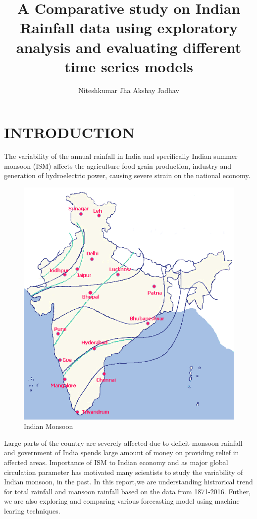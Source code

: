 \documentclass[12pt,openany]{book}
\title{A Comparative study on Indian Rainfall data using exploratory analysis and evaluating different time series models}
\author{Niteshkumar Jha Akshay Jadhav}
\date{}
\begin{document}
\maketitle

{
\setcounter{tocdepth}{1}
\tableofcontents
}
\listoftables
\listoffigures
\hypertarget{intro}{%
\chapter{INTRODUCTION}\label{intro}}

The variability of the annual rainfall in India and specifically Indian summer monsoon (ISM) affects the agriculture food grain production, industry and generation of hydroelectric power, causing severe strain on the national economy.

\begin{figure}
\centering
\includegraphics{Indian_monsoon.PNG}
\caption{Indian Monsoon}
\end{figure}

Large parts of the country are severely affected due to deficit monsoon rainfall and government of India spends large amount of money on providing relief in affected areas. Importance of ISM to Indian economy and as major global circulation parameter has motivated many scientists to study the variability of Indian monsoon, in the past. In this report,we are understanding histrorical trend for total rainfall and mansoon rainfall based on the data from 1871-2016. Futher, we are also exploring and comparing various forecasting model using machine learing techniques.
\end{document}
